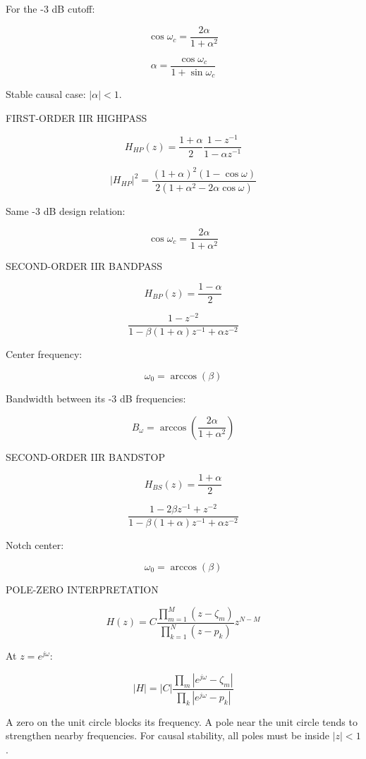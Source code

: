 For the -3 dB cutoff:

$$\cos\omega_c=\frac{2\alpha}{1+\alpha^2}$$

$$\alpha=\frac{\cos\omega_c}{1+\sin\omega_c}$$

Stable causal case: $|\alpha|<1$.

FIRST-ORDER IIR HIGHPASS

$$H_{HP}(z)=\frac{1+\alpha}{2}\frac{1-z^{-1}}{1-\alpha z^{-1}}$$

$$|H_{HP}|^2=\frac{(1+\alpha)^2(1-\cos\omega)}{2(1+\alpha^2-2\alpha\cos\omega)}$$

Same -3 dB design relation:

$$\cos\omega_c=\frac{2\alpha}{1+\alpha^2}$$

SECOND-ORDER IIR BANDPASS

$$H_{BP}(z)=\frac{1-\alpha}{2}$$

$$\frac{1-z^{-2}}{1-\beta(1+\alpha)z^{-1}+\alpha z^{-2}}$$

Center frequency:

$$\omega_0=\arccos(\beta)$$

Bandwidth between its -3 dB frequencies:

$$B_\omega=\arccos\left(\frac{2\alpha}{1+\alpha^2}\right)$$

SECOND-ORDER IIR BANDSTOP

$$H_{BS}(z)=\frac{1+\alpha}{2}$$

$$\frac{1-2\beta z^{-1}+z^{-2}}{1-\beta(1+\alpha)z^{-1}+\alpha z^{-2}}$$

Notch center:

$$\omega_0=\arccos(\beta)$$

POLE-ZERO INTERPRETATION

$$H(z)=C\frac{\prod_{m=1}^{M}(z-\zeta_m)}{\prod_{k=1}^{N}(z-p_k)}z^{N-M}$$

At $z=e^{j\omega}$:

$$|H|=|C|\frac{\prod_m|e^{j\omega}-\zeta_m|}{\prod_k|e^{j\omega}-p_k|}$$

A zero on the unit circle blocks its frequency. A pole near the unit circle tends to strengthen nearby frequencies. For causal stability, all poles must be inside $|z|<1$.
